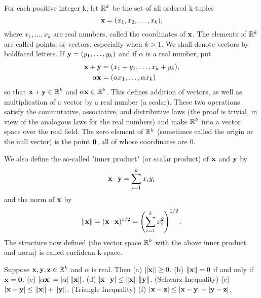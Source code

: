 \begin{definition} %
  \label{def:chap1:euclidean_k_space}
  For each positive integer k, let $\mathbb{R}^k$ be the set of all ordered k-tuples
  \[ \mathbf{x} = (x_1, x_2, \dots, x_k), \]
  where $x_1, \dots, x_k$ are real numbers, called the coordinates of
  $\mathbf{x}$. The elements of $\mathbb{R}^k$ are called points, or vectors,
  especially when $k>1$. We shall denote vectors by boldfaced
  letters. If $\mathbf{y} = (y_1, \dots, y_k)$ and if $\alpha$ is a
  real number, put
  \begin{align*}
    \mathbf{x} + \mathbf{y} &= (x_1 + y_1, \dots, x_k + y_k), \\
    \alpha \mathbf{x} &= (\alpha x_1, \dots, \alpha x_k)
  \end{align*}
  so that $\mathbf{x} + \mathbf{y} \in \mathbb{R}^k$ and $\alpha \mathbf{x} \in
  \mathbb{R}^k$. This defines addition of vectors, as well as multiplication
  of a vector by a real number (a scalar). These two operations
  satisfy the commutative, associative, and distributive laws (the
    proof is trivial, in view of the analogous laws for the real
  numbers) and make $\mathbb{R}^k$ into a vector space over the real field.
  The zero element of $\mathbb{R}^k$ (sometimes called the origin or the null
  vector) is the point $\mathbf{0}$, all of whose coordinates are 0.

  We also define the so-called "inner product" (or scalar product) of
  $\mathbf{x}$ and $\mathbf{y}$ by
  \[ \mathbf{x} \cdot \mathbf{y} = \sum_{i=1}^{k} x_i y_i \]
  and the norm of $\mathbf{x}$ by
  \[ \left\lVert \mathbf{x} \right\rVert = (\mathbf{x} \cdot \mathbf{x})^{1/2} = \left(
  \sum_{i=1}^{k} x_i^2 \right)^{1/2}. \]
  The structure now defined (the vector space $\mathbb{R}^k$ with the above
  inner product and norm) is called euclidean k-space.
\end{definition}

\begin{theorem} %
  \label{thm:chap1:norm_inner_product_properties}
  Suppose $\mathbf{x}, \mathbf{y}, \mathbf{z} \in \mathbb{R}^k$ and $\alpha$ is real. Then
  (a) $\left\lVert \mathbf{x} \right\rVert \ge 0$.
  (b) $\left\lVert \mathbf{x} \right\rVert = 0$ if and only if $\mathbf{x} = \mathbf{0}$.
  (c) $|\alpha \mathbf{x}| = |\alpha| \left\lVert \mathbf{x} \right\rVert$.
  (d) $|\mathbf{x} \cdot \mathbf{y}| \le \left\lVert \mathbf{x} \right\rVert
  \left\lVert \mathbf{y} \right\rVert$. (Schwarz Inequality)
  (e) $|\mathbf{x} + \mathbf{y}| \le \left\lVert \mathbf{x} \right\rVert + \left\lVert \mathbf{y} \right\rVert$.
  (Triangle Inequality)
  (f) $|\mathbf{x} - \mathbf{z}| \le |\mathbf{x} - \mathbf{y}| + |\mathbf{y} - \mathbf{z}|$.
\end{theorem}

